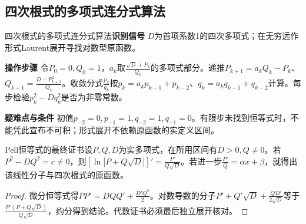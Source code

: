 \subsection{四次根式的多项式连分式算法}\label{ic:indefinite_algebra_complete:continuedfraction}\begin{method}{四次根式的多项式连分式算法}\textbf{识别信号} $D$为首项系数1的四次多项式；在无穷远作形式Laurent展开寻找对数型原函数。\par \textbf{操作步骤} 令$P_0=0,Q_0=1$，$a_k$取$\frac{\sqrt D+P_k}{Q_k}$的多项式部分。递推$P_{k+1}=a_kQ_k-P_k$、$Q_{k+1}=\frac{D-P_{k+1}^2}{Q_k}$。收敛分式$\frac{p_k}{q_k}$按$p_k=a_kp_{k-1}+p_{k-2}$、$q_k=a_kq_{k-1}+q_{k-2}$计算。每步检验$p_k^2-Dq_k^2$是否为非零常数。\par \textbf{疑难点与条件} 初值$p_{-2}=0,p_{-1}=1,q_{-2}=1,q_{-1}=0$。有限步未找到恒等式时，不能凭此宣布不可积；形式展开不依赖原函数的实定义区间。\end{method}

\begin{theorem}{Pell恒等式的最终证书}设$P,Q,D$为实多项式，在所用区间有$D>0,Q\ne0$。若$P^2-DQ^2=c\ne0$，则$[\ln|P+Q\sqrt D|]'=\frac{P'}{Q\sqrt D}$。若进一步$\frac{P'}{Q}=\alpha x+\beta$，就得出该线性分子与四次根式的原函数。\end{theorem}\begin{proof}微分恒等式得$PP'=DQQ'+\frac{D'Q^2}{2}$。对数导数的分子$P'+Q'\sqrt D+\frac{QD'}{2\sqrt D}$等于$\frac{P'(P+Q\sqrt D)}{Q\sqrt D}$，约分得到结论。代数证书必须最后独立展开核对。\end{proof}

